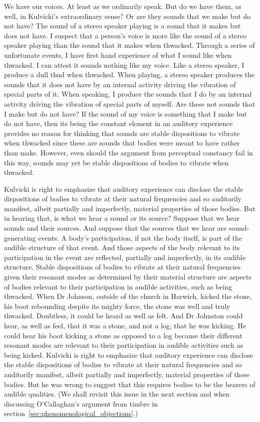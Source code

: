 We have our voices. At least as we ordinarily speak. But do we have them, as well, in Kulvicki's extraordinary sense? Or are they sounds that we make but do not have? The sound of a stereo speaker playing is a sound that it makes but does not have. I suspect that a person's voice is more like the sound of a stereo speaker playing than the sound that it makes when thwacked. Through a series of unfortunate events, I have first hand experience of what I sound like when thwacked. I can attest it sounds nothing like my voice. Like a stereo speaker, I produce a dull thud when thwacked. When playing, a stereo speaker produces the sounds that it does not have by an internal activity driving the vibration of special parts of it. When speaking, I produce the sounds that I do by an internal activity driving the vibration of special parts of myself. Are these not sounds that I make but do not have? If the sound of my voice is something that I make but do not have, then its being the constant element in an auditory experience provides no reason for thinking that sounds are stable dispositions to vibrate when thwacked since these are sounds that bodies were meant to have rather than make. However, even should the argument from perceptual constancy fail in this way, sounds may yet be stable dispositions of bodies to vibrate when thwacked.

Kulvicki is right to emphasize that auditory experience can disclose the stable dispositions of bodies to vibrate at their natural frequencies and so auditorily manifest, albeit partially and imperfectly, material properties of those bodies. But in hearing that, is what we hear a sound or its source? Suppose that we hear sounds and their sources. And suppose that the sources that we hear are sound-generating events. A body's participation, if not the body itself, is part of the audible structure of that event. And those aspects of the body relevant to its participation in the event are reflected, partially and imperfectly, in its audible structure. Stable dispositions of bodies to vibrate at their natural frequencies given their resonant modes as determined by their material structure are aspects of bodies relevant to their participation in audible activities, such as being thwacked. When Dr Johnson, outside of the church in Harwich, kicked the stone, his boot rebounding despite its mighty force, the stone was well and truly thwacked. Doubtless, it could be heard as well as felt. And Dr Johnston could hear, as well as feel, that it was a stone, and not a log, that he was kicking. He could hear his boot kicking a stone as opposed to a log because their different resonant modes are relevant to their participation in audible activities such as being kicked. Kulvicki is right to emphasize that auditory experience can disclose the stable dispositions of bodies to vibrate at their natural frequencies and so auditorily manifest, albeit partially and imperfectly, material properties of these bodies. But he was wrong to suggest that this requires bodies to be the bearers of audible qualities. (We shall revisit this issue in the next section and when discussing O'Callaghan's argument from timbre in section~\ref{sec:phenomenological_objections}.)  

